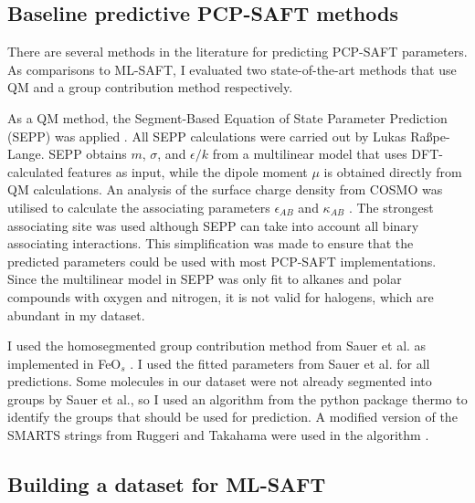 




\subsection{Baseline predictive PCP-SAFT methods}\label{sec:baselines}

There are several methods in the literature for predicting PCP-SAFT parameters. As comparisons to ML-SAFT, I evaluated two state-of-the-art methods that use QM and a group contribution method respectively.

As a QM method, the Segment-Based Equation of State Parameter Prediction (SEPP) was applied \cite{Kaminski2020}. All SEPP calculations were carried out by Lukas Ra{\ss}pe-Lange. SEPP obtains $m$, $\sigma$, and $\epsilon/k$ from a multilinear model that uses DFT-calculated features as input, while the dipole moment $\mu$ is obtained directly from QM calculations. An analysis of the surface charge density from COSMO was utilised to calculate the associating parameters $\epsilon_{AB}$ and $\kappa_{AB}$ \cite{Klamt1995}. The strongest associating site was used although SEPP can take into account all binary associating interactions. This simplification was made to ensure that the predicted parameters could be used with most PCP-SAFT implementations. Since the multilinear model in SEPP was only fit to alkanes and polar compounds with oxygen and nitrogen, it is not valid for halogens, which are abundant in my dataset.

I used the homosegmented group contribution method from Sauer et al. \cite{Sauer2014} as implemented in FeO$_{s}$ \cite{Rehner2023}. I used the fitted parameters from Sauer et al. for all predictions. Some molecules in our dataset were not already segmented into groups by Sauer et al., so I used an algorithm from the python package thermo \cite{thermopython} to identify the groups that should be used for prediction.  A modified version of the SMARTS strings from Ruggeri and Takahama were used in the algorithm \cite{Ruggeri2016}.

\subsection{Building a dataset for ML-SAFT}\label{subsec:data_set}

